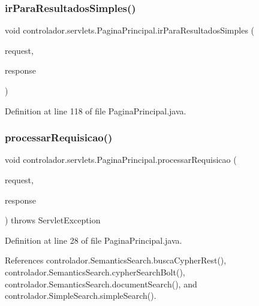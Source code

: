 \subsubsection{\texorpdfstring{ir\+Para\+Resultados\+Simples()}{irParaResultadosSimples()}}
{\footnotesize\ttfamily void controlador.\+servlets.\+Pagina\+Principal.\+ir\+Para\+Resultados\+Simples (\begin{DoxyParamCaption}\item[{Http\+Servlet\+Request}]{request,  }\item[{Http\+Servlet\+Response}]{response }\end{DoxyParamCaption})\hspace{0.3cm}{\ttfamily [private]}}



Definition at line 118 of file Pagina\+Principal.\+java.

\hypertarget{classcontrolador_1_1servlets_1_1PaginaPrincipal_a0a1fdddaf14f14c6454d400fb4cdc6f2}{}\label{classcontrolador_1_1servlets_1_1PaginaPrincipal_a0a1fdddaf14f14c6454d400fb4cdc6f2} 
\subsubsection{\texorpdfstring{processar\+Requisicao()}{processarRequisicao()}}
{\footnotesize\ttfamily void controlador.\+servlets.\+Pagina\+Principal.\+processar\+Requisicao (\begin{DoxyParamCaption}\item[{Http\+Servlet\+Request}]{request,  }\item[{Http\+Servlet\+Response}]{response }\end{DoxyParamCaption}) throws Servlet\+Exception\hspace{0.3cm}{\ttfamily [private]}}



Definition at line 28 of file Pagina\+Principal.\+java.



References controlador.\+Semantics\+Search.\+busca\+Cypher\+Rest(), controlador.\+Semantics\+Search.\+cypher\+Search\+Bolt(), controlador.\+Semantics\+Search.\+document\+Search(), and controlador.\+Simple\+Search.\+simple\+Search().



